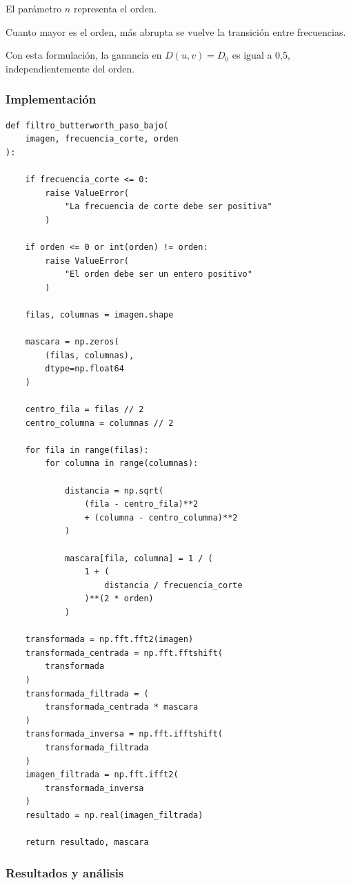 \documentclass[11pt,letterpaper]{article}
\begin{document}
El parámetro $n$ representa el orden.

Cuanto mayor es el orden, más abrupta
se vuelve la transición entre frecuencias.

Con esta formulación, la ganancia en
$D(u,v)=D_0$ es igual a 0,5,
independientemente del orden.

\subsubsection*{Implementación}

\begin{lstlisting}
def filtro_butterworth_paso_bajo(
    imagen, frecuencia_corte, orden
):

    if frecuencia_corte <= 0:
        raise ValueError(
            "La frecuencia de corte debe ser positiva"
        )

    if orden <= 0 or int(orden) != orden:
        raise ValueError(
            "El orden debe ser un entero positivo"
        )

    filas, columnas = imagen.shape

    mascara = np.zeros(
        (filas, columnas),
        dtype=np.float64
    )

    centro_fila = filas // 2
    centro_columna = columnas // 2

    for fila in range(filas):
        for columna in range(columnas):

            distancia = np.sqrt(
                (fila - centro_fila)**2
                + (columna - centro_columna)**2
            )

            mascara[fila, columna] = 1 / (
                1 + (
                    distancia / frecuencia_corte
                )**(2 * orden)
            )

    transformada = np.fft.fft2(imagen)
    transformada_centrada = np.fft.fftshift(
        transformada
    )
    transformada_filtrada = (
        transformada_centrada * mascara
    )
    transformada_inversa = np.fft.ifftshift(
        transformada_filtrada
    )
    imagen_filtrada = np.fft.ifft2(
        transformada_inversa
    )
    resultado = np.real(imagen_filtrada)

    return resultado, mascara
\end{lstlisting}

\subsubsection*{Resultados y análisis}
\end{document}
